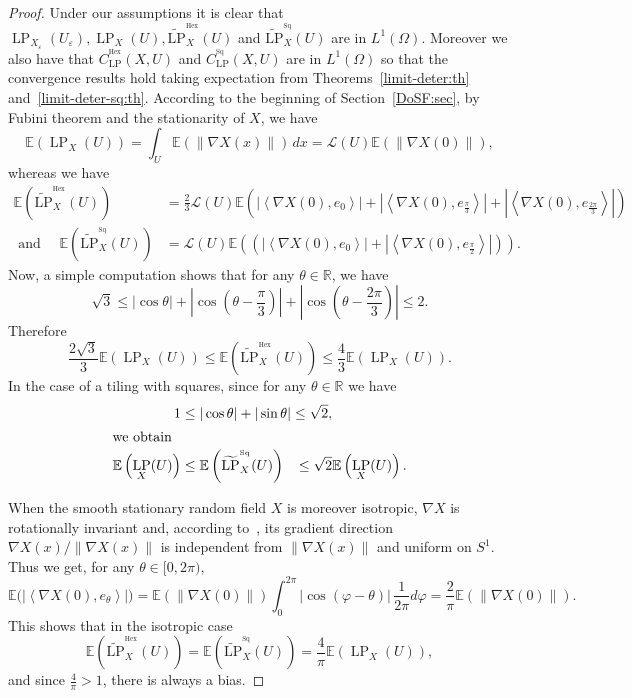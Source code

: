 \documentclass[AHL,Unicode,longabstracts,published]{cedram}
\newcommand{\R}{\mathbb{R}}
\newcommand{\E}{\mathbb{E}}
\newcommand{\eps}{\varepsilon}
\DeclareMathOperator{\LP}{LP}
\DeclareMathOperator{\Hex}{Hex}
\DeclareMathOperator{\Sq}{Sq}
\newcommand{\tLP}{\widetilde{\mathrm{LP}}}
\newcommand{\calL}{\mathcal{L}}
\begin{document}
\begin{proof}
Under our assumptions it is clear that $\LP_{X_\eps}(U_\eps), \LP_X(U), \tLP^{^{\Hex}}_{X}(U)$ and $\tLP^{^{\Sq}}_{X}(U)$ are in $L^1(\Omega)$. Moreover we also have that $C_{\LP}^{^{\Hex}}(X,U)$ and $C_{\LP}^{^{\Sq}}(X,U)$ are in $L^1(\Omega)$ so that the convergence results hold taking expectation from Theorems~\ref{limit-deter:th} and~\ref{limit-deter-sq:th}. According to the beginning of Section~\ref{DoSF:sec}, by Fubini theorem and the stationarity of $X$, we have
\[
\E\left(\LP_{X}(U)\right) = \int_U \E \left(\left\|\nabla X(x)\right\|\right) \, dx = \calL(U)
\E \left(\left\|\nabla X(0)\right\|\right),
\]
whereas we have
\begin{align*}
\E\left(\tLP^{^{\Hex}}_{X}(U)\right) &= \frac{2}{3} \calL(U) \E \left(
\left|\left\langle \nabla X(0), e_0\right\rangle\right| + \left|\left\langle \nabla X(0), e_{\frac{\pi}{3}}\right\rangle\right| +\left|\left\langle \nabla X(0),
e_{\frac{2\pi}{3}}\right\rangle\right|\right)
\\
\text{ and } \quad \E\left(\tLP^{^{\Sq}}_{X}(U)\right) &= {\calL}(U)
\E \left(\left(\left|\left\langle \nabla X(0), e_0\right\rangle\right| +\left|\left\langle \nabla
X(0), e_{\frac{\pi}{2}}\right\rangle\right|\right)\right).
\end{align*}
Now, a simple computation shows that for any $\theta\in\R$, we have
\[
\sqrt{3} \leq |\cos\theta| + \left|\cos\left(\theta-\frac{\pi}{3}\right)\right| +
\left|\cos\left(\theta-\frac{2\pi}{3}\right)\right| \leq 2.
\]
Therefore
\[
\frac{2\sqrt{3}}{3} \E\left(\LP_{X}(U)\right) \leq
\E\left(\tLP^{^{\Hex}}_{X}(U)\right) \leq \frac{4}{3} \E\left(\LP_{X}(U)\right).
\]
In the case of a tiling with squares, since for any $\theta\in\R$ we have
\begin{align*}
1 &\leq |\cos\theta| + |\sin\theta| \leq \sqrt{2},
\\
\intertext{we obtain}
\E\left(\LP_{X}(U)\right) &\leq \E\left(\tLP^{^{\Sq}}_{X}(U)\right) \quad\!\leq \sqrt{2} \E\left(\LP_{X}(U)\right).
\end{align*}


When the smooth stationary random field $X$ is moreover isotropic, $\nabla X$ is rotationally invariant and, according to~\cite[Proposition~4.10]{Bilodeau}, its gradient direction $\nabla X(x)/\| \nabla X(x)\|$ is independent from $\| \nabla X(x)\|$ and uniform on $S^1$. Thus we get, for any $\theta\in[0,2\pi)$,
\[
\E\big(\left|\left\langle \nabla X(0), e_\theta\right\rangle\right|\big) = \E\left(
\left\| \nabla X(0) \right\|\right) \int_0^{2\pi}\left|\cos\left(\varphi-\theta\right)\right| \,
\frac{1}{2\pi} d\varphi = \frac{2}{\pi} \E\left(\left\| \nabla X(0)\right\|\right)
.
\]
This shows that in the isotropic case
\[
\E\left(\tLP^{^{\Hex}}_{X}(U)\right) = \E\left(\tLP^{^{\Sq}}_{X}(U)\right) =
\frac{4}{\pi} \E\left(\LP_{X}(U)\right),
\]
and since $\frac{4}{\pi}>1$, there is always a bias.
\end{proof}
\end{document}

